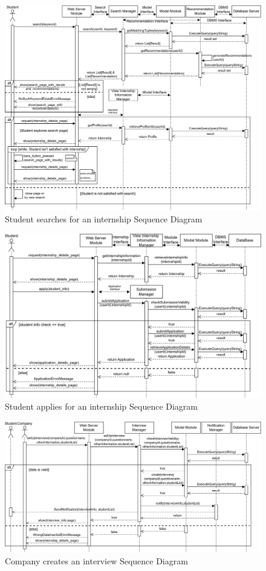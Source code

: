 \begin{figure}[H]
    \centering
    \includegraphics[width=1\textwidth]{Images/Runtime_view/searchInt_SD.png}
    \caption{Student searches for an internship Sequence Diagram}
\end{figure}
\begin{figure}[H]
    \centering
    \includegraphics[width=1\textwidth]{Images/Runtime_view/applyInt_SD.png}
    \caption{Student applies for an internship Sequence Diagram}
\end{figure}
\begin{figure}[H]
    \centering
    \includegraphics[width=1\textwidth]{Images/Runtime_view/createIntvw_SD.png}
    \caption{Company creates an interview Sequence Diagram}
\end{figure}
